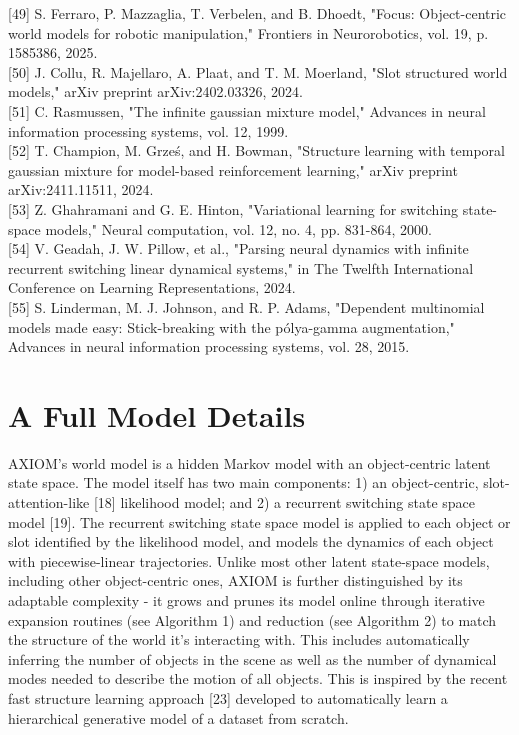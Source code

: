 \documentclass[10pt]{article}
\begin{document}
[49] S. Ferraro, P. Mazzaglia, T. Verbelen, and B. Dhoedt, "Focus: Object-centric world models for robotic manipulation," Frontiers in Neurorobotics, vol. 19, p. 1585386, 2025.\\[0pt]
[50] J. Collu, R. Majellaro, A. Plaat, and T. M. Moerland, "Slot structured world models," arXiv preprint arXiv:2402.03326, 2024.\\[0pt]
[51] C. Rasmussen, "The infinite gaussian mixture model," Advances in neural information processing systems, vol. 12, 1999.\\[0pt]
[52] T. Champion, M. Grześ, and H. Bowman, "Structure learning with temporal gaussian mixture for model-based reinforcement learning," arXiv preprint arXiv:2411.11511, 2024.\\[0pt]
[53] Z. Ghahramani and G. E. Hinton, "Variational learning for switching state-space models," Neural computation, vol. 12, no. 4, pp. 831-864, 2000.\\[0pt]
[54] V. Geadah, J. W. Pillow, et al., "Parsing neural dynamics with infinite recurrent switching linear dynamical systems," in The Twelfth International Conference on Learning Representations, 2024.\\[0pt]
[55] S. Linderman, M. J. Johnson, and R. P. Adams, "Dependent multinomial models made easy: Stick-breaking with the pólya-gamma augmentation," Advances in neural information processing systems, vol. 28, 2015.

\section*{A Full Model Details}
AXIOM's world model is a hidden Markov model with an object-centric latent state space. The model itself has two main components: 1) an object-centric, slot-attention-like [18] likelihood model; and 2) a recurrent switching state space model [19]. The recurrent switching state space model is applied to each object or slot identified by the likelihood model, and models the dynamics of each object with piecewise-linear trajectories. Unlike most other latent state-space models, including other object-centric ones, AXIOM is further distinguished by its adaptable complexity - it grows and prunes its model online through iterative expansion routines (see Algorithm 1) and reduction (see Algorithm 2) to match the structure of the world it's interacting with. This includes automatically inferring the number of objects in the scene as well as the number of dynamical modes needed to describe the motion of all objects. This is inspired by the recent fast structure learning approach [23] developed to automatically learn a hierarchical generative model of a dataset from scratch.
\end{document}
